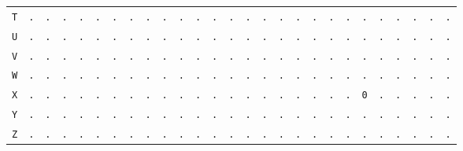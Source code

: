 \begin{figure}[H]
\begin{center}
{\begin{tabular}{c|cccccccccccccccccccccccccc}
				\texttt{T} & \texttt{.} & \texttt{.} & \texttt{.} & \texttt{.} & \texttt{.} & \texttt{.} & \texttt{.} & \texttt{.} & \texttt{.} & \texttt{.} & \texttt{.} & \texttt{.} & \texttt{.} & \texttt{.} & \texttt{.} & \texttt{.} & \texttt{.} & \texttt{.} & \texttt{.} & \texttt{.} & \texttt{.} & \texttt{.} & \texttt{.} & \texttt{.} & \texttt{.} & \texttt{.} \\
				\texttt{U} & \texttt{.} & \texttt{.} & \texttt{.} & \texttt{.} & \texttt{.} & \texttt{.} & \texttt{.} & \texttt{.} & \texttt{.} & \texttt{.} & \texttt{.} & \texttt{.} & \texttt{.} & \texttt{.} & \texttt{.} & \texttt{.} & \texttt{.} & \texttt{.} & \texttt{.} & \texttt{.} & \texttt{.} & \texttt{.} & \texttt{.} & \texttt{.} & \texttt{.} & \texttt{.} \\
				\texttt{V} & \texttt{.} & \texttt{.} & \texttt{.} & \texttt{.} & \texttt{.} & \texttt{.} & \texttt{.} & \texttt{.} & \texttt{.} & \texttt{.} & \texttt{.} & \texttt{.} & \texttt{.} & \texttt{.} & \texttt{.} & \texttt{.} & \texttt{.} & \texttt{.} & \texttt{.} & \texttt{.} & \texttt{.} & \texttt{.} & \texttt{.} & \texttt{.} & \texttt{.} & \texttt{.} \\
				\texttt{W} & \texttt{.} & \texttt{.} & \texttt{.} & \texttt{.} & \texttt{.} & \texttt{.} & \texttt{.} & \texttt{.} & \texttt{.} & \texttt{.} & \texttt{.} & \texttt{.} & \texttt{.} & \texttt{.} & \texttt{.} & \texttt{.} & \texttt{.} & \texttt{.} & \texttt{.} & \texttt{.} & \texttt{.} & \texttt{.} & \texttt{.} & \texttt{.} & \texttt{.} & \texttt{.} \\
				\texttt{X} & \texttt{.} & \texttt{.} & \texttt{.} & \texttt{.} & \texttt{.} & \texttt{.} & \texttt{.} & \texttt{.} & \texttt{.} & \texttt{.} & \texttt{.} & \texttt{.} & \texttt{.} & \texttt{.} & \texttt{.} & \texttt{.} & \texttt{.} & \texttt{.} & \texttt{.} & \texttt{.} & \texttt{0} & \texttt{.} & \texttt{.} & \texttt{.} & \texttt{.} & \texttt{.} \\
				\texttt{Y} & \texttt{.} & \texttt{.} & \texttt{.} & \texttt{.} & \texttt{.} & \texttt{.} & \texttt{.} & \texttt{.} & \texttt{.} & \texttt{.} & \texttt{.} & \texttt{.} & \texttt{.} & \texttt{.} & \texttt{.} & \texttt{.} & \texttt{.} & \texttt{.} & \texttt{.} & \texttt{.} & \texttt{.} & \texttt{.} & \texttt{.} & \texttt{.} & \texttt{.} & \texttt{.} \\
				\texttt{Z} & \texttt{.} & \texttt{.} & \texttt{.} & \texttt{.} & \texttt{.} & \texttt{.} & \texttt{.} & \texttt{.} & \texttt{.} & \texttt{.} & \texttt{.} & \texttt{.} & \texttt{.} & \texttt{.} & \texttt{.} & \texttt{.} & \texttt{.} & \texttt{.} & \texttt{.} & \texttt{.} & \texttt{.} & \texttt{.} & \texttt{.} & \texttt{.} & \texttt{.} & \texttt{.} \\
			\end{tabular}
		}
	\end{center}
\end{figure}
